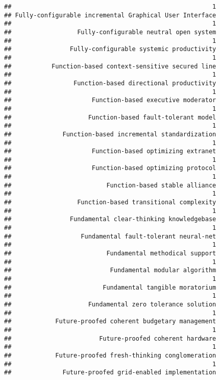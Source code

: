 \documentclass[
]{article}
\begin{document}
\begin{verbatim}
##                                                       1 
## Fully-configurable incremental Graphical User Interface 
##                                                       1 
##                  Fully-configurable neutral open system 
##                                                       1 
##                Fully-configurable systemic productivity 
##                                                       1 
##           Function-based context-sensitive secured line 
##                                                       1 
##                 Function-based directional productivity 
##                                                       1 
##                      Function-based executive moderator 
##                                                       1 
##                     Function-based fault-tolerant model 
##                                                       1 
##              Function-based incremental standardization 
##                                                       1 
##                      Function-based optimizing extranet 
##                                                       1 
##                      Function-based optimizing protocol 
##                                                       1 
##                          Function-based stable alliance 
##                                                       1 
##                  Function-based transitional complexity 
##                                                       1 
##                Fundamental clear-thinking knowledgebase 
##                                                       1 
##                   Fundamental fault-tolerant neural-net 
##                                                       1 
##                          Fundamental methodical support 
##                                                       1 
##                           Fundamental modular algorithm 
##                                                       1 
##                         Fundamental tangible moratorium 
##                                                       1 
##                     Fundamental zero tolerance solution 
##                                                       1 
##            Future-proofed coherent budgetary management 
##                                                       1 
##                        Future-proofed coherent hardware 
##                                                       1 
##            Future-proofed fresh-thinking conglomeration 
##                                                       1 
##              Future-proofed grid-enabled implementation 

\end{verbatim}
\end{document}
